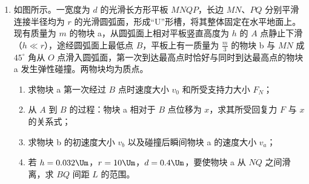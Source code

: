\documentclass[\gkver]{gaokaozhenti}
\begin{document}
\begin{enumerate}
\item
如图所示。一宽度为 $d$ 的光滑长方形平板 $MNQP$，长边 $MN$、$PQ$ 分别平滑连接半径均为 $r$ 的光滑圆弧面，形成“U”形槽，将其整体固定在水平地面上。现有质量为 $m$ 的物块 a，从圆弧面上相对平板竖直高度为 $h$ 的 $A$ 点静止下滑（$h \ll r$），途经圆弧面上最低点 $B$，平板上有一质量为 $\frac{m}{3}$ 的物块 b 与 $MN$ 成 $45^{\circ}$ 角从 $O$ 点滑入圆弧面，第一次到达最高点时恰好与同时到达最高点的物块 a 发生弹性碰撞。两物块均为质点。
\begin{enumerate}
	\item
	求物块 a 第一次经过 $B$ 点时速度大小 $v_{0}$ 和所受支持力大小 $F_{N}$；
	\item
	从 $A$ 到 $B$ 的过程：物块 a 相对于 $B$ 点位移为 $x$，求其所受回复力 $F$ 与 $x$ 的关系式；
	\item
	求物块 b 的初速度大小 $v_{b}$ 以及碰撞后瞬间物块 a 的速度大小 $v_{a}$；
	\item
	若 $h = 0.032\Um$，$r = 10\Um$，$d = 0.4\Um$，要使物块 a 从 $NQ$ 之间滑离，求 $BQ$ 间距 $L$ 的范围。
\end{enumerate}
\end{enumerate}
\end{document}
